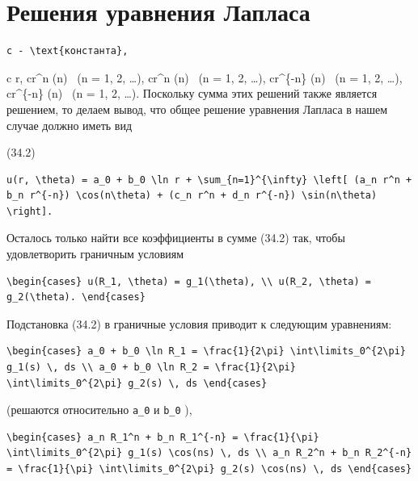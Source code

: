\documentclass[
  ukrainian,
]{article}
\begin{document}
\section{Решения уравнения
Лапласа}\label{ux440ux435ux448ux435ux43dux438ux44f-ux443ux440ux430ux432ux43dux435ux43dux438ux44f-ux43bux430ux43fux43bux430ux441ux430}

\begin{verbatim}
c - \text{константа},
\end{verbatim}

c \ln r, cr\^{}n \cos(n\theta) ~(n = 1, 2, \ldots), cr\^{}n
\sin(n\theta) ~(n = 1, 2, \ldots), cr\^{}\{-n\} \cos(n\theta) ~(n = 1,
2, \ldots), cr\^{}\{-n\} \sin(n\theta) ~(n = 1, 2, \ldots). Поскольку
сумма этих решений также является решением, то делаем вывод, что общее
решение уравнения Лапласа в нашем случае должно иметь вид

(34.2)

\begin{verbatim}
u(r, \theta) = a_0 + b_0 \ln r + \sum_{n=1}^{\infty} \left[ (a_n r^n + b_n r^{-n}) \cos(n\theta) + (c_n r^n + d_n r^{-n}) \sin(n\theta) \right].
\end{verbatim}

Осталось только найти все коэффициенты в сумме (34.2) так, чтобы
удовлетворить граничным условиям

\begin{verbatim}
\begin{cases} u(R_1, \theta) = g_1(\theta), \\ u(R_2, \theta) = g_2(\theta). \end{cases}
\end{verbatim}

Подстановка (34.2) в граничные условия приводит к следующим уравнениям:

\begin{verbatim}
\begin{cases} a_0 + b_0 \ln R_1 = \frac{1}{2\pi} \int\limits_0^{2\pi} g_1(s) \, ds \\ a_0 + b_0 \ln R_2 = \frac{1}{2\pi} \int\limits_0^{2\pi} g_2(s) \, ds \end{cases}
\end{verbatim}

(решаются относительно \texttt{a\_0} и \texttt{b\_0} ),

\begin{verbatim}
\begin{cases} a_n R_1^n + b_n R_1^{-n} = \frac{1}{\pi} \int\limits_0^{2\pi} g_1(s) \cos(ns) \, ds \\ a_n R_2^n + b_n R_2^{-n} = \frac{1}{\pi} \int\limits_0^{2\pi} g_2(s) \cos(ns) \, ds \end{cases}
\end{verbatim}
\end{document}
